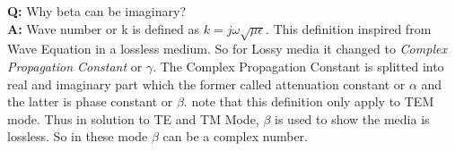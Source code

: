 \textbf{Q:} Why beta can be imaginary?\\
\textbf{A:} Wave number or k is defined as $ k = j \omega \sqrt{\mu \epsilon} $. This definition inspired from Wave Equation in a lossless medium. So for Lossy media it changed to {\it Complex Propagation Constant} or $\gamma$.  The Complex Propagation Constant is splitted into real and imaginary part which the former called attenuation constant or $\alpha$ and the latter is phase constant or $\beta$. note that this definition only apply to TEM mode. Thus in solution to TE and TM Mode, $\beta$ is used to show the media is lossless. So in these mode $\beta$ can be a complex number.
